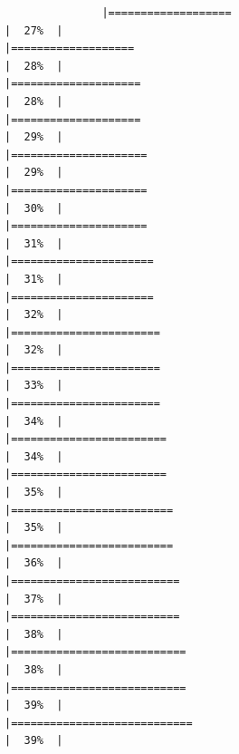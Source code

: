 \documentclass[
]{article}
\begin{document}
\begin{verbatim}
               |===================                                                   |  27%  |                                                                              |===================                                                   |  28%  |                                                                              |====================                                                  |  28%  |                                                                              |====================                                                  |  29%  |                                                                              |=====================                                                 |  29%  |                                                                              |=====================                                                 |  30%  |                                                                              |=====================                                                 |  31%  |                                                                              |======================                                                |  31%  |                                                                              |======================                                                |  32%  |                                                                              |=======================                                               |  32%  |                                                                              |=======================                                               |  33%  |                                                                              |=======================                                               |  34%  |                                                                              |========================                                              |  34%  |                                                                              |========================                                              |  35%  |                                                                              |=========================                                             |  35%  |                                                                              |=========================                                             |  36%  |                                                                              |==========================                                            |  37%  |                                                                              |==========================                                            |  38%  |                                                                              |===========================                                           |  38%  |                                                                              |===========================                                           |  39%  |                                                                              |============================                                          |  39%  |                                                                
\end{verbatim}
\end{document}

